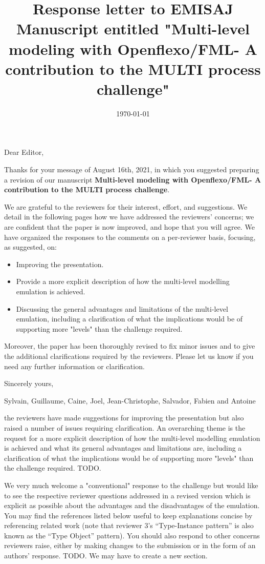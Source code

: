 \documentclass[10pt]{article}
\title{Response letter to EMISAJ Manuscript entitled "Multi-level modeling with Openflexo/FML- A contribution to the MULTI process challenge"}
\date{\today}
\begin{document}
Dear Editor,

\bigskip
Thanks for your message of August 16th, 2021, in which you suggested preparing a revision of our manuscript  \textbf{Multi-level modeling with Openflexo/FML- A contribution to the MULTI process challenge}. 

\bigskip
We are grateful to the reviewers for their interest, effort, and suggestions. We detail in the following pages how we have addressed the reviewers' concerns; we are confident that the paper is now improved, and hope that you will agree. We have organized the responses to the comments on a per-reviewer basis, focusing, as suggested, on: 

\begin{itemize}
\item Improving the presentation.
\item Provide a more explicit description of how the multi-level modelling emulation is achieved.
\item Discussing the general advantages and limitations of the multi-level emulation, including a clarification of what the implications would be of supporting more "levels" than the challenge required.
\end{itemize}

Moreover, the paper has been thoroughly revised to fix minor issues and to give the additional clarifications required by the reviewers. Please let us know if you need any further information or clarification.

\bigskip
Sincerely yours,

\bigskip
Sylvain, Guillaume, Caine, Joel, Jean-Christophe, Salvador, Fabien and Antoine

\pagebreak

\Editor{}

\begin{response}{the reviewers have made suggestions for improving the presentation but also raised a number of issues requiring clarification. An overarching theme is the request for a more explicit description of how the multi-level modelling emulation is achieved and what its general advantages and limitations are, including a clarification of what the implications would be of supporting more "levels" than the challenge required.} TODO.
\end{response}


\begin{response}{We very much welcome a "conventional" response to the challenge but would like to see the respective reviewer questions addressed in a revised version which is explicit as possible about the advantages and the disadvantages of the emulation. You may find the references listed below useful to keep explanations concise by referencing related work (note that reviewer 3’s “Type-Instance pattern” is also known as the “Type Object” pattern). You should also respond to other concerns reviewers raise, either by making changes to the submission or in the form of an authors' response.} TODO. We may have to create a new section.
\end{response}
\end{document}
